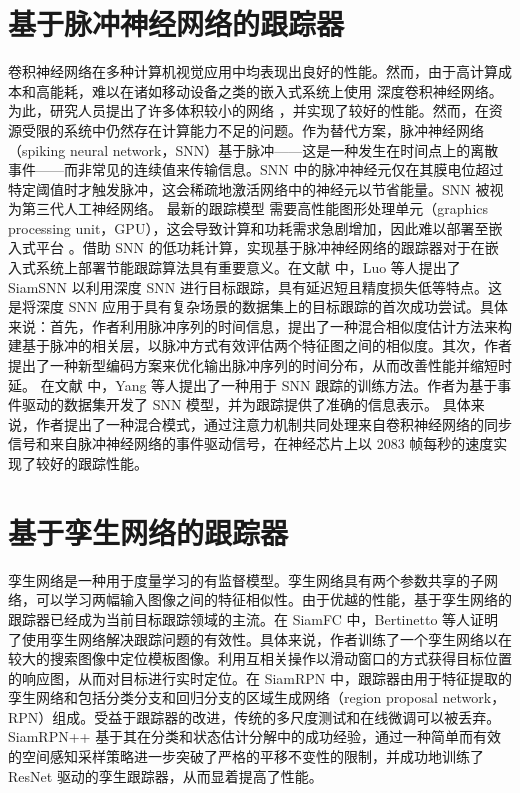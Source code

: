 \section{基于脉冲神经网络的跟踪器}%
卷积神经网络在多种计算机视觉应用中均表现出良好的性能。然而，由于高计算成本和高能耗，难以在诸如移动设备之类的嵌入式系统上使用 深度卷积神经网络。为此，研究人员提出了许多体积较小的网络 \cite{wei2018quantization}，并实现了较好的性能。然而，在资源受限的系统中仍然存在计算能力不足的问题。作为替代方案，脉冲神经网络（spiking neural network，SNN）基于脉冲——这是一种发生在时间点上的离散事件——而非常见的连续值来传输信息。SNN 中的脉冲神经元仅在其膜电位超过特定阈值时才触发脉冲，这会稀疏地激活网络中的神经元以节省能量。SNN 被视为第三代人工神经网络。
最新的跟踪模型 \cite{SiamFC,SiamRPN} 需要高性能图形处理单元（graphics processing unit，GPU），这会导致计算和功耗需求急剧增加，因此难以部署至嵌入式平台 \cite{basu2018low}。借助 SNN 的低功耗计算，实现基于脉冲神经网络的跟踪器对于在嵌入式系统上部署节能跟踪算法具有重要意义。在文献 \cite{SiamSNN} 中，Luo 等人提出了 SiamSNN 以利用深度 SNN 进行目标跟踪，具有延迟短且精度损失低等特点。这是将深度 SNN 应用于具有复杂场景的数据集上的目标跟踪的首次成功尝试。具体来说：首先，作者利用脉冲序列的时间信息，提出了一种混合相似度估计方法来构建基于脉冲的相关层，以脉冲方式有效评估两个特征图之间的相似度。其次，作者提出了一种新型编码方案来优化输出脉冲序列的时间分布，从而改善性能并缩短时延。
在文献 \cite{DashNet} 中，Yang 等人提出了一种用于 SNN 跟踪的训练方法。作者为基于事件驱动的数据集开发了 SNN 模型，并为跟踪提供了准确的信息表示。
具体来说，作者提出了一种混合模式，通过注意力机制共同处理来自卷积神经网络的同步信号和来自脉冲神经网络的事件驱动信号，在神经芯片上以 2083 帧每秒的速度实现了较好的跟踪性能。%
\section{基于孪生网络的跟踪器}
孪生网络是一种用于度量学习的有监督模型。孪生网络具有两个参数共享的子网络，可以学习两幅输入图像之间的特征相似性。由于优越的性能，基于孪生网络的跟踪器已经成为当前目标跟踪领域的主流。在 SiamFC \cite{SiamFC} 中，Bertinetto 等人证明了使用孪生网络解决跟踪问题的有效性。具体来说，作者训练了一个孪生网络以在较大的搜索图像中定位模板图像。利用互相关操作以滑动窗口的方式获得目标位置的响应图，从而对目标进行实时定位。在 SiamRPN \cite{SiamRPN} 中，跟踪器由用于特征提取的孪生网络和包括分类分支和回归分支的区域生成网络（region proposal network，RPN）组成。受益于跟踪器的改进，传统的多尺度测试和在线微调可以被丢弃。SiamRPN++ \cite{SiamRPN++} 基于其在分类和状态估计分解中的成功经验，通过一种简单而有效的空间感知采样策略进一步突破了严格的平移不变性的限制，并成功地训练了 ResNet \cite{he2016deep} 驱动的孪生跟踪器，从而显着提高了性能。
